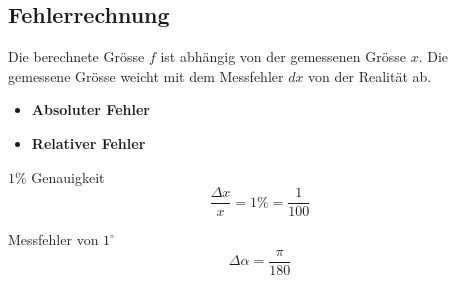 \subsection{Fehlerrechnung}
    Die berechnete Grösse $f$ ist abhängig von der gemessenen Grösse $x$.
    Die gemessene Grösse weicht mit dem Messfehler $dx$ von der Realität ab.
    \begin{itemize}
        \item \textbf{Absoluter Fehler}
            \vspace*{-0.5em}
        \item \textbf{Relativer Fehler}
            \vspace*{-0.5em}
    \end{itemize}
        \vspace{0.5em}
        \begin{minipage}{0.54\linewidth}
            \centering \vspace{4pt}
            $1\%$ Genauigkeit
            $$
                \frac{\Delta x}{x} = 1\% = \frac{1}{100}
            $$          
        \end{minipage}
        \begin{minipage}{0.45\linewidth}
            \centering
            Messfehler von $1^\circ$
            $$
                \Delta \alpha = \frac{\pi}{180}
            $$
        \end{minipage}